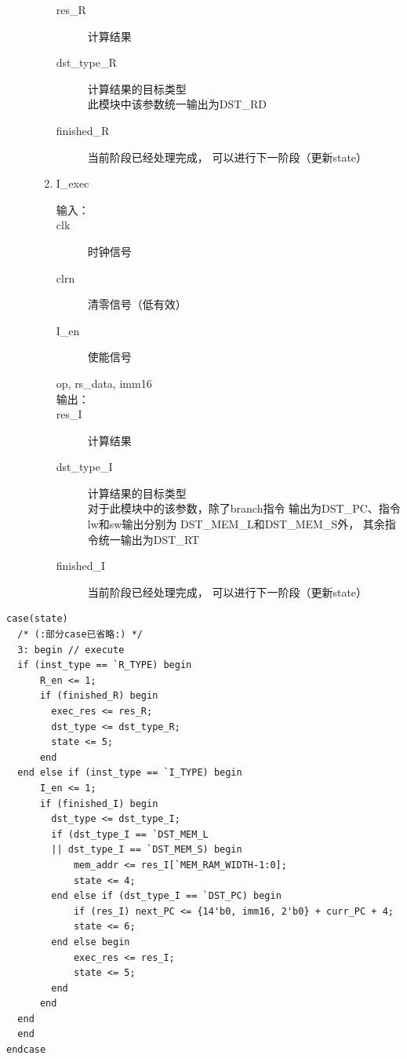 \documentclass[12pt,a4paper,UTF8]{article}
\begin{document}
\begin{description}
\begin{enumerate}
\begin{description}
                  \item[res\_R] 计算结果
                  \item[dst\_type\_R] 计算结果的目标类型\\
                        此模块中该参数统一输出为DST\_RD
                  \item[finished\_R] 当前阶段已经处理完成，
                        可以进行下一阶段（更新state）
                \end{description}
          \item I\_exec
                \begin{description}
                  \item[输入：] \hspace*{\fill}
                  \item[clk] 时钟信号
                  \item[clrn] 清零信号（低有效）
                  \item[I\_en] 使能信号
                  \item[op, rs\_data, imm16] \hspace*{\fill}
                  \item[输出：] \hspace*{\fill}
                  \item[res\_I] 计算结果
                  \item[dst\_type\_I] 计算结果的目标类型\\
                        对于此模块中的该参数，除了branch指令
                        输出为DST\_PC、指令lw和sw输出分别为
                        DST\_MEM\_L和DST\_MEM\_S外，
                        其余指令统一输出为DST\_RT
                  \item[finished\_I] 当前阶段已经处理完成，
                        可以进行下一阶段（更新state）
                \end{description}
        \end{enumerate}
\end{description}

\begin{lstlisting}[style=verilog-style]
case(state)
  /* (:部分case已省略:) */
  3: begin // execute
  if (inst_type == `R_TYPE) begin
      R_en <= 1;
      if (finished_R) begin
        exec_res <= res_R;
        dst_type <= dst_type_R;
        state <= 5;
      end
  end else if (inst_type == `I_TYPE) begin
      I_en <= 1;
      if (finished_I) begin
        dst_type <= dst_type_I;
        if (dst_type_I == `DST_MEM_L
        || dst_type_I == `DST_MEM_S) begin
            mem_addr <= res_I[`MEM_RAM_WIDTH-1:0];
            state <= 4;
        end else if (dst_type_I == `DST_PC) begin
            if (res_I) next_PC <= {14'b0, imm16, 2'b0} + curr_PC + 4;
            state <= 6;
        end else begin
            exec_res <= res_I;
            state <= 5;
        end
      end
  end
  end
endcase
\end{lstlisting}
\end{document}
